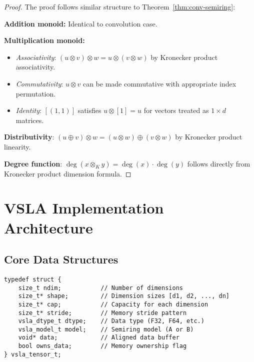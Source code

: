 \documentclass[sigconf,review]{acmart}
\begin{document}
\begin{proof}
The proof follows similar structure to Theorem~\ref{thm:conv-semiring}:

\textbf{Addition monoid:} Identical to convolution case.

\textbf{Multiplication monoid:}
\begin{itemize}
\item \emph{Associativity}: $(u \otimes v) \otimes w = u \otimes (v \otimes w)$ by Kronecker product associativity.
\item \emph{Commutativity}: $u \otimes v$ can be made commutative with appropriate index permutation.
\item \emph{Identity}: $[(1,1)]$ satisfies $u \otimes [1] = u$ for vectors treated as $1 \times d$ matrices.
\end{itemize}

\textbf{Distributivity}: $(u \oplus v) \otimes w = (u \otimes w) \oplus (v \otimes w)$ by Kronecker product linearity.

\textbf{Degree function}: $\deg(x \otimes_K y) = \deg(x) \cdot \deg(y)$ follows directly from Kronecker product dimension formula.
\end{proof}

\section{VSLA Implementation Architecture}
\label{sec:vsla}

\subsection{Core Data Structures}

\begin{tcolorbox}[colback=api,colframe=green!50!black,title=VSLA Tensor API]
\begin{verbatim}
typedef struct {
    size_t ndim;           // Number of dimensions
    size_t* shape;         // Dimension sizes [d1, d2, ..., dn]
    size_t* cap;           // Capacity for each dimension
    size_t* stride;        // Memory stride pattern
    vsla_dtype_t dtype;    // Data type (F32, F64, etc.)
    vsla_model_t model;    // Semiring model (A or B)
    void* data;            // Aligned data buffer
    bool owns_data;        // Memory ownership flag
} vsla_tensor_t;
\end{verbatim}
\end{tcolorbox}
\end{document}
